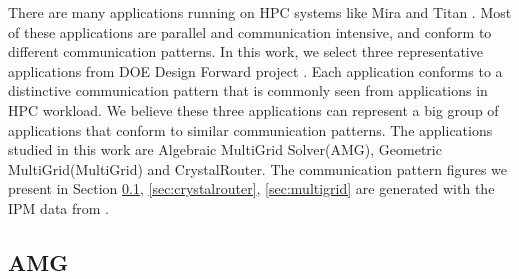 \documentclass[conference]{IEEEtran}
\begin{document}
There are many applications running on HPC systems like Mira \cite{bgq} and Titan \cite{titan}. Most of these applications are parallel and communication intensive, and conform to different communication patterns. In this work, we select three representative applications from DOE Design Forward project \cite{designforwardwebpage}. Each application conforms to a distinctive communication pattern that is commonly seen from applications in HPC workload. We believe these three applications can represent a big group of applications that conform to similar communication patterns. The applications studied in this work are Algebraic MultiGrid Solver(AMG), Geometric MultiGrid(MultiGrid) and CrystalRouter. The communication pattern figures we present in Section \ref{sec:amg}, \ref{sec:crystalrouter}, \ref{sec:multigrid} are generated with the IPM \cite{ipm} data from \cite{designforwardwebpage}.



\subsection{AMG}
\label{sec:amg}
\end{document}
